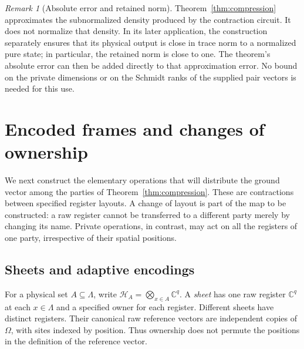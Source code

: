 \documentclass[11pt]{article}
\numberwithin{equation}{section}
\theoremstyle{definition}
\theoremstyle{remark}
\newtheorem{remark}[theorem]{Remark}
\begin{document}
\begin{remark}[Absolute error and retained norm]
\label{rem:compression-retained-norm}
Theorem~\ref{thm:compression} approximates the subnormalized density
produced by the contraction circuit.  It does not normalize that
density.  In its later application, the construction separately ensures
that its physical output is close in trace norm to a normalized pure
state; in particular, the retained norm is close to one.  The theorem's
absolute error can then be added directly to that approximation error.
No bound on the private dimensions or on the Schmidt ranks of the
supplied pair vectors is needed for this use.
\end{remark}

\section{Encoded frames and changes of ownership}\label{sec:frames}

We next construct the elementary operations that will distribute the ground
vector among the parties of Theorem~\ref{thm:compression}.  These are
contractions between specified register layouts.  A change of layout is part
of the map to be constructed: a raw register cannot be transferred to a
different party merely by changing its name.  Private operations, in contrast,
may act on all the registers of one party, irrespective of their spatial
positions.

\subsection{Sheets and adaptive encodings}

For a physical set $A\subseteq\Lambda$, write
$\mathcal H_A=\bigotimes_{x\in A}\mathbb C^q$.  A \emph{sheet} has one raw
register $\mathbb C^q$ at each $x\in\Lambda$ and a specified owner for each
register.  Different sheets have distinct registers.  Their canonical raw
reference vectors are independent copies of $\Omega$, with sites indexed by
position.  Thus ownership does not permute the positions in the definition
of the reference vector.
\end{document}
